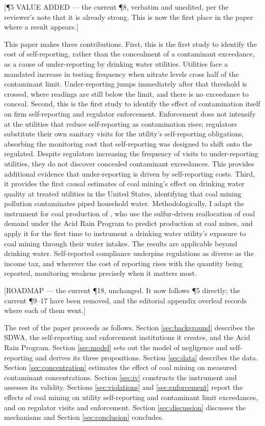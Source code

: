 \documentclass[12pt]{article}
\newcommand{\annot}[1]{%
  \par\nobreak\vspace{0.35em}%
  {\footnotesize\sffamily\color{annotcol}\raggedright #1\par}%
  \nobreak\vspace{-0.35em}\nobreak}
\begin{document}
\annot{[\P5 \textbullet{} VALUE ADDED --- the current \P8, verbatim and unedited, per the
reviewer's note that it is already strong. This is now the first place in the paper where
a result appears.]}
This paper makes three contributions. First, this is the first study to identify the cost of self-reporting, rather than the concealment of a contaminant exceedance, as a cause of under-reporting by drinking water utilities. Utilities face a mandated increase in testing frequency when nitrate levels cross half of the contaminant limit. Under-reporting jumps immediately after that threshold is crossed, where readings are still below the limit, and there is no exceedance to conceal. Second, this is the first study to identify the effect of contamination itself on firm self-reporting and regulator enforcement. Enforcement does not intensify at the utilities that reduce self-reporting as contamination rises; regulators substitute their own sanitary visits for the utility's self-reporting obligations, absorbing the monitoring cost that self-reporting was designed to shift onto the regulated. Despite regulators increasing the frequency of visits to under-reporting utilities, they do not discover concealed contaminant exceedances. This provides additional evidence that under-reporting is driven by self-reporting costs. Third, it provides the first causal estimates of coal mining's effect on drinking water quality at treated utilities in the United States, identifying that coal mining pollution contaminates piped household water. Methodologically, I adapt the instrument for coal production of \textcite{stratford2015coalprod}, who use the sulfur-driven reallocation of coal demand under the Acid Rain Program to predict production at coal mines, and apply it for the first time to instrument a drinking water utility's exposure to coal mining through their water intakes. The results are applicable beyond drinking water. Self-reported compliance underpins regulations as diverse as the income tax, and wherever the cost of reporting rises with the quantity being reported, monitoring weakens precisely when it matters most.

\annot{[ROADMAP --- the current \P18, unchanged. It now follows \P5 directly; the current
\P9--17 have been removed, and the editorial appendix overleaf records where each of them
went.]}
The rest of the paper proceeds as follows. Section \ref{sec:background} describes the SDWA, the self-reporting and enforcement institutions it creates, and the Acid Rain Program. Section \ref{sec:model} sets out the model of negligence and self-reporting and derives its three propositions. Section \ref{sec:data} describes the data. Section \ref{sec:concentration} estimates the effect of coal mining on measured contaminant concentrations. Section \ref{sec:iv} constructs the instrument and assesses its validity. Sections \ref{sec:violations} and \ref{sec:enforcement} report the effects of coal mining on utility self-reporting and contaminant limit exceedances, and on regulator visits and enforcement. Section \ref{sec:discussion} discusses the mechanisms and Section \ref{sec:conclusion} concludes.
\end{document}
